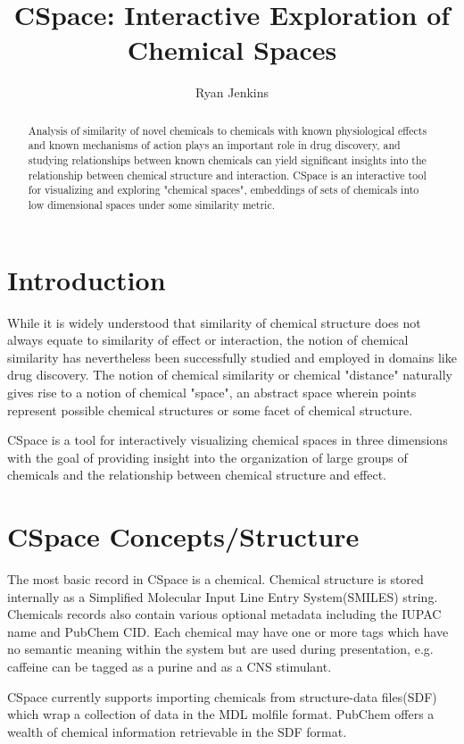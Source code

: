 \documentclass[12pt]{article}
\title{CSpace: Interactive Exploration of Chemical Spaces}
\author{Ryan Jenkins}
\begin{document}
\maketitle

\begin{abstract}
Analysis of similarity of novel chemicals to chemicals with known physiological effects and known mechanisms of action plays an important role in drug discovery, and studying relationships between known chemicals can yield significant insights into the relationship between chemical structure and interaction. CSpace is an interactive tool for visualizing and exploring "chemical spaces", embeddings of sets of chemicals into low dimensional spaces under some similarity metric.
\end{abstract}

\newpage
\section{Introduction}
While it is widely understood that similarity of chemical structure does not always equate to similarity of effect or interaction, the notion of chemical similarity has nevertheless been successfully studied and employed in domains like drug discovery\cite{Nikolova2003}. The notion of chemical similarity or chemical "distance" naturally gives rise to a notion of chemical "space", an abstract space wherein points represent possible chemical structures or some facet of chemical structure.

CSpace is a tool for interactively visualizing chemical spaces in three dimensions with the goal of providing insight into the organization of large groups of chemicals and the relationship between chemical structure and effect.

\section{CSpace Concepts/Structure}
The most basic record in CSpace is a chemical. Chemical structure is stored internally as a Simplified Molecular Input Line Entry System(SMILES) string\cite{Weininger1988}. Chemicals records also contain various optional metadata including the IUPAC name and PubChem CID. Each chemical may have one or more tags which have no semantic meaning within the system but are used during presentation, e.g. caffeine can be tagged as a purine and as a CNS stimulant.

CSpace currently supports importing chemicals from structure-data files(SDF) which wrap a collection of data in the MDL molfile format. PubChem offers a wealth of chemical information retrievable in the SDF format.
\end{document}
